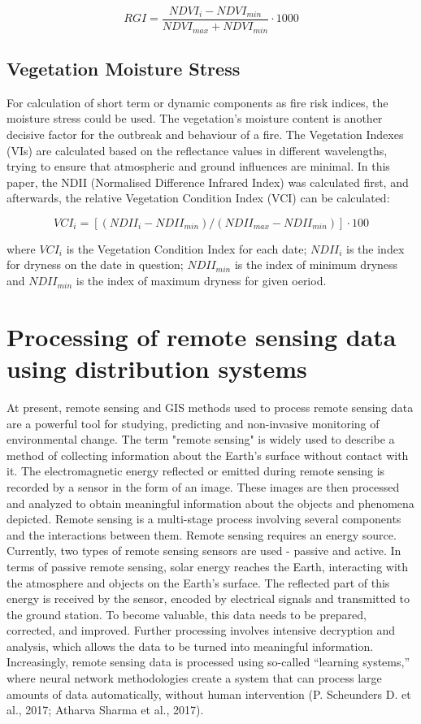{{	\begin{equation}
	RGI = \dfrac{NDVI_{i} - NDVI_{min}}{NDVI_{max} + NDVI_{min}} \cdot 1000
	\end{equation}

\subsection{Vegetation Moisture Stress}
	For calculation of short term or dynamic components as fire risk indices, the moisture stress could be used.
	The vegetation’s moisture content is another decisive factor for the outbreak and behaviour of a fire.
	The Vegetation Indexes (VIs) are calculated based on the reflectance values in different
	wavelengths, trying to ensure that atmospheric and ground influences are minimal. In this
	paper, the NDII (Normalised Difference Infrared Index) was calculated first, and afterwards, the relative Vegetation Condition Index (VCI) can be calculated:
	
	\begin{equation}
	VCI_{i}=[(NDII_{i} - NDII_{min})/(NDII_{max} - NDII_{min})] \cdot 100
	\end{equation}
	
	where $VCI_{i}$ is the Vegetation Condition Index for each date; $NDII_{i}$ is the index for dryness on the date in question; $NDII_{min}$ is the index of minimum dryness and $NDII_{min}$ is the index of maximum dryness for given oeriod.

\section{Processing of remote sensing data using distribution systems}
	At present, remote sensing and GIS methods used to process remote sensing data are a powerful tool for studying, predicting and non-invasive monitoring of environmental change.
	The term "remote sensing" is widely used to describe a method of collecting information about the Earth's surface without contact with it. The electromagnetic energy reflected or emitted during remote sensing is recorded by a sensor in the form of an image. These images are then processed and analyzed to obtain meaningful information about the objects and phenomena depicted. Remote sensing is a multi-stage process involving several components and the interactions between them. Remote sensing requires an energy source. Currently, two types of remote sensing sensors are used - passive and active. In terms of passive remote sensing, solar energy reaches the Earth, interacting with the atmosphere and objects on the Earth’s surface. The reflected part of this energy is received by the sensor, encoded by electrical signals and transmitted to the ground station. To become valuable, this data needs to be prepared, corrected, and improved. Further processing involves intensive decryption and analysis, which allows the data to be turned into meaningful information. Increasingly, remote sensing data is processed using so-called “learning systems,” where neural network methodologies create a system that can process large amounts of data automatically, without human intervention (P. Scheunders D. et al., 2017; Atharva Sharma et al., 2017).
	
}}
